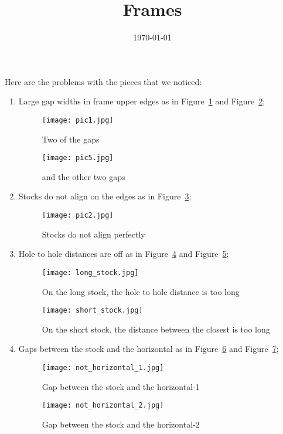 \documentclass[12pt]{article}
\theoremstyle{definition}
\begin{document}
\title{Frames}
\author{}
\date{\today}
\maketitle
\linespread{2}
Here are the problems with the pieces that we noticed:
\begin{enumerate}
  \item Large gap widths in frame upper edges as in Figure~\ref{gapwidth1} and Figure~\ref{gapwidth2};
  \begin{figure}[!ht]
    \centering
    \texttt{[image: pic1.jpg]}
    \caption{Two of the gaps}
    \label{gapwidth1}
  \end{figure}
  \begin{figure}[!ht]
    \centering
    \texttt{[image: pic5.jpg]}
    \caption{and the other two gaps}
    \label{gapwidth2}
  \end{figure}

  \item Stocks do not align on the edges as in Figure~\ref{notalign};
  \begin{figure}[!ht]
    \centering
    \texttt{[image: pic2.jpg]}
    \caption{Stocks do not align perfectly}
    \label{notalign}
  \end{figure}

  \item Hole to hole distances are off as in Figure~\ref{longstock} and Figure~\ref{shortstock};
  \begin{figure}[!ht]
    \centering
    \texttt{[image: long\_stock.jpg]}
    \caption{On the long stock, the hole to hole distance is too long}
    \label{longstock}
  \end{figure}
  \begin{figure}[!ht]
    \centering
    \texttt{[image: short\_stock.jpg]}
    \caption{On the short stock, the distance between the closest is too long }
    \label{shortstock}
  \end{figure}

  \item Gaps between the stock and the horizontal as in Figure~\ref{nothorizontal1} and Figure~\ref{nothorizontal2};
  \begin{figure}[!ht]
    \centering
    \texttt{[image: not\_horizontal\_1.jpg]}
    \caption{Gap between the stock and the horizontal-1}
    \label{nothorizontal1}
  \end{figure}
  \begin{figure}[!ht]
    \centering
    \texttt{[image: not\_horizontal\_2.jpg]}
    \caption{Gap between the stock and the horizontal-2}
    \label{nothorizontal2}
  \end{figure}


\end{enumerate}
\end{document}
